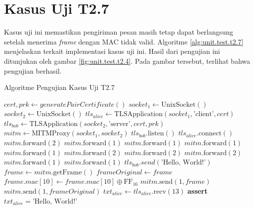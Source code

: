 \section{Kasus Uji T2.7}

Kasus uji ini memastikan pengiriman pesan masih tetap dapat berlangsung setelah menerima \emph{frame} dengan MAC tidak valid. Algoritme \ref{alg:unit.test.t2.7} menjelaskan terkait implementasi kasus uji ini. Hasil dari pengujian ini ditunjukan oleh gambar \ref{fig:unit.test.t2.4}. Pada gambar tersebut, terlihat bahwa pengujian berhasil.


\begin{algorithm}
  \caption{Algoritme Pengujian Kasus Uji T2.7}
  \label{alg:unit.test.t2.7}
  \begin{algorithmic}
    \State $cert, prk \gets generatePairCertificate()$
    \State $socket_1 \gets \text{UnixSocket}()$
    \State $socket_2 \gets \text{UnixSocket}()$
    \State $tls_{alice} \gets \text{TLSApplication}(socket_1, \text{'client'}, cert)$ 
    \State $tls_{bob} \gets \text{TLSApplication}(socket_2, \text{'server'}, cert, prk)$
    \State $mitm \gets \text{MITMProxy}(socket_1, socket_2)$
    \State
    \State $tls_{bob}.\text{listen}()$  
    \State $tls_{alice}.\text{connect}()$  
    \State
    \State $mitm.\text{forward}(2)$ 
    \State $mitm.\text{forward}(1)$ 
    \State $mitm.\text{forward}(1)$ 
    \State $mitm.\text{forward}(1)$ 
    \State $mitm.\text{forward}(1)$ 
    \State $mitm.\text{forward}(2)$ 
    \State $mitm.\text{forward}(2)$ 
    \State $mitm.\text{forward}(2)$ 
    \State $mitm.\text{forward}(1)$ 
    \State $mitm.\text{forward}(1)$ 
    \State
    \State $tls_{bob}.send(\text{'Hello, World!'})$
    \State $frame \gets mitm.\text{getFrame}()$
    \State $frameOriginal \gets frame$
    \State $frame.mac[10] \gets frame.mac[10] \oplus \text{FF}_{16}$ 
    \State $mitm.\text{send}(1, frame)$
    \State $mitm.\text{send}(1, frameOriginal)$
    \State
    \State $txt_{alice} \gets tls_{alice}.\text{recv}(13)$
    \State \textbf{assert} $txt_{alice} = \text{'Hello, World!'}$
  \end{algorithmic}
\end{algorithm}

